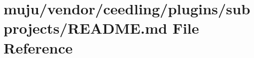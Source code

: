 \hypertarget{vendor_2ceedling_2plugins_2subprojects_2_r_e_a_d_m_e_8md}{}\section{muju/vendor/ceedling/plugins/subprojects/\+R\+E\+A\+D\+ME.md File Reference}
\label{vendor_2ceedling_2plugins_2subprojects_2_r_e_a_d_m_e_8md}
